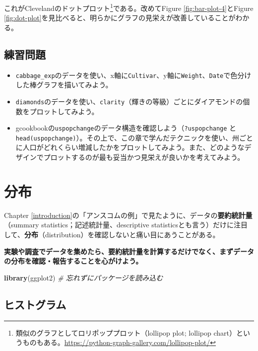\documentclass[]{book}
\newenvironment{Shaded}{\begin{snugshade}}{\end{snugshade}}
\newcommand{\KeywordTok}[1]{\textcolor[rgb]{0.13,0.29,0.53}{\textbf{#1}}}
\newcommand{\CommentTok}[1]{\textcolor[rgb]{0.56,0.35,0.01}{\textit{#1}}}
\newcommand{\NormalTok}[1]{#1}
\let\rmarkdownfootnote\footnote%
\def\footnote{\protect\rmarkdownfootnote}
\begin{document}
これがClevelandのドットプロット\footnote{類似のグラフとしてロリポッププロット（lollipop
  plot; lollipop
  chart）というものもある。\url{https://python-graph-gallery.com/lollipop-plot/}}である。改めてFigure
\ref{fig:bar-plot-4}とFigure
\ref{fig:dot-plot}を見比べると、明らかにグラフの見栄えが改善していることがわかる。

\section{練習問題}

\begin{itemize}
\item
  \texttt{cabbage\_exp}のデータを使い、x軸に\texttt{Cultivar}、y軸に\texttt{Weight}、\texttt{Date}で色分けした棒グラフを描いてみよう。
\item
  \texttt{diamonds}のデータを使い、\texttt{clarity}（輝きの等級）ごとにダイアモンドの個数をプロットしてみよう。
\item
  gcookbookの\texttt{uspopchange}のデータ構造を確認しよう（\texttt{?uspopchange}
  と
  \texttt{head(uspopchange)}）。その上で、この章で学んだテクニックを使い、州ごとに人口がどれくらい増減したかをプロットしてみよう。また、どのようなデザインでプロットするのが最も妥当かつ見栄えが良いかを考えてみよう。
\end{itemize}

\chapter{分布}\label{distribution}

Chapter
\ref{introduction}の「アンスコムの例」で見たように、データの\textbf{要約統計量}（summary
statistics；記述統計量、descriptive
statisticsとも言う）だけに注目して、\textbf{分布}（distribution）を確認しないと痛い目にあうことがある。

\textbf{実験や調査でデータを集めたら、要約統計量を計算するだけでなく、まずデータの分布を確認・報告することを心がけよう。}

\begin{Shaded}
\begin{Highlighting}[]
\KeywordTok{library}\NormalTok{(ggplot2) }\CommentTok{# 忘れずにパッケージを読み込む}
\end{Highlighting}
\end{Shaded}

\section{ヒストグラム}
\end{document}
